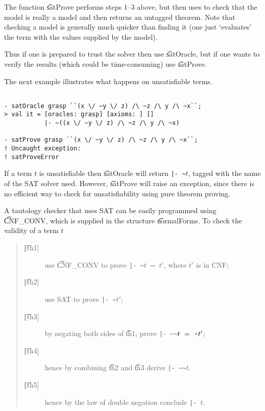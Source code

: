 The function \t{satProve}  performs steps 1--3 above, but then uses
\HOL{} to check that the model is really a model and then
returns an untagged theorem. Note that checking a model is
generally much quicker than finding it (one just `evaluates' the term
with the values supplied by the model).

Thus if one is prepared to trust the solver then use \t{satOracle},
but if one wants to verify the results (which could be time-consuming)
use \t{satProve}.


The next example illustrates what happens on unsatisfiable terms.

\begin{session}\begin{verbatim}

- satOracle grasp ``(x \/ ~y \/ z) /\ ~z /\ y /\ ~x``;
> val it = [oracles: grasp] [axioms: ] [] 
           |- ~((x \/ ~y \/ z) /\ ~z /\ y /\ ~x)

- satProve grasp ``(x \/ ~y \/ z) /\ ~z /\ y /\ ~x``;
! Uncaught exception: 
! satProveError

\end{verbatim}\end{session}

If a term $t$ is unsatisfiable then \t{satOracle} will return {\small\verb+|- ~+}$t$,
tagged with the name of the SAT solver used. However, \t{satProve} will raise an exception,
since there is no efficient way to check for unsatisfiability using pure \HOL{} theorem proving.

A tautology checker that uses SAT can be easily programmed using
\t{CNF\_CONV}, which is supplied in the structure \t{normalForms}. To check the validity of a term $t$

\begin{quote}
\begin{description}
\item[\t{[th1]}] use \t{CNF\_CONV} to prove {\small\verb+|- ~+}$t~=~t'$, where $t'$ is in CNF;
\item[\t{[th2]}] use SAT to prove  {\small\verb+|- ~+}$t'$;
\item[\t{[th3]}] by negating both sides of \t{th1}, prove {\small\verb+|- ~~+}$t~=~{\verb+~+}t'$;
\item[\t{[th4]}] hence by combining \t{th2} and \t{th3} derive {\small\verb+|- ~~+}$t$.
\item[\t{[th5]}] hence by the law of double negation conclude {\small\verb+|- +}$t$.
\end{description}
\end{quote}

